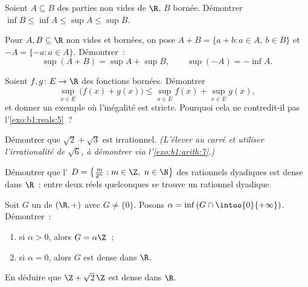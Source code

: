 \begin{exercise}[$\star$]\label{exo:b1:reals:4}
Soient $A \subseteq B$ des parties non vides de $\R$, $B$ bornée.
Démontrer $\inf B \leq \inf A \leq \sup A \leq \sup B$.
\end{exercise}

\begin{exercise}[$\star\star$]\label{exo:b1:reals:5}
Pour $A, B \subseteq \R$ non vides et bornées, on pose $A + B = \{a +
b : a \in A,\ b \in B\}$ et $-A = \{-a : a \in A\}$. Démontrer~:
\[
\sup(A + B) = \sup A + \sup B,
\qquad
\sup(-A) = -\inf A .
\]
\end{exercise}

\begin{exercise}[$\star\star$]\label{exo:b1:reals:6}
Soient $f, g \colon E \to \R$ des fonctions bornées. Démontrer
\[
\sup_{x \in E}\, \bigl(f(x) + g(x)\bigr) \leq \sup_{x \in E} f(x) +
\sup_{x \in E} g(x),
\]
et donner un exemple où l'inégalité est stricte. Pourquoi cela ne
contredit-il pas l'\cref{exo:b1:reals:5}~?
\end{exercise}

\begin{exercise}[$\star\star$]\label{exo:b1:reals:7}
Démontrer que $\sqrt 2 + \sqrt 3$ est irrationnel. \emph{(L'élever au
carré et utiliser l'irrationalité de $\sqrt 6$, à démontrer via
l'\cref{exo:b1:arith:7}.)}
\end{exercise}

\begin{exercise}[$\star\star$]\label{exo:b1:reals:8}
Démontrer que l' $D = \bigl\{\frac{m}{2^n} : m \in \Z,\ n \in
\N\bigr\}$ des rationnels dyadiques est dense dans $\R$~: entre deux
réels quelconques se trouve un rationnel dyadique.
\end{exercise}

\begin{exercise}[$\star\star\star$]\label{exo:b1:reals:9}
Soit $G$ un  de $(\R, +)$ avec $G \neq \{0\}$. Posons
$\alpha = \inf\,(G \cap \intoo{0}{+\infty})$. Démontrer~:
\begin{enumerate}
  \item si $\alpha > 0$, alors $G = \alpha\Z$~;
  \item si $\alpha = 0$, alors $G$ est dense dans $\R$.
\end{enumerate}
En déduire que $\Z + \sqrt 2\,\Z$ est dense dans $\R$.
\end{exercise}

